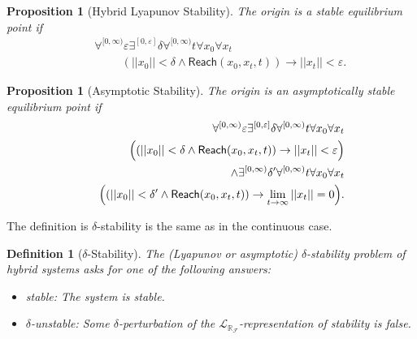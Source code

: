 \documentclass[10pt]{article}
\theoremstyle{plain}
\newtheorem{proposition}[theorem]{Proposition}
\newtheorem{definition}[theorem]{Definition}
\theoremstyle{definition}
\newcommand{\reach}{\mathsf{Reach}}
\newcommand{\lrf}{\mathcal{L}_{\mathbb{R}_{\mathcal{F}}}}
\begin{document}
\begin{proposition}[Hybrid Lyapunov Stability]
The origin is a stable equilibrium point if 
\begin{eqnarray*}
& &\forall^{[0,\infty)} \varepsilon\exists^{[0,\varepsilon]} \delta \forall^{[0,\infty)} t\forall x_0\forall x_t\\
& &\hspace{1cm}(||x_0||<\delta \wedge \reach(x_0,x_t,t) )\rightarrow ||x_t||<\varepsilon.
\end{eqnarray*}
\end{proposition}
\begin{proposition}[Asymptotic Stability]
The origin is an asymptotically stable equilibrium point if 
\begin{eqnarray*}
& &\forall^{[0,\infty)} \varepsilon\exists^{[0,\varepsilon]} \delta\forall^{[0,\infty)} t\forall x_0\forall x_t\\
& &\hspace{.5cm}\Big((||x_0||<\delta \wedge \reach(x_0,x_t,t) )\rightarrow ||x_t||<\varepsilon\Big)\\
& &\wedge \exists^{[0,\infty)} \delta'  \forall^{[0,\infty)} t\forall x_0\forall x_t\\
& & \hspace{.3cm}\Big( (||x_0||<\delta'\wedge \reach(x_0,x_t,t))\rightarrow \lim_{t\rightarrow \infty} ||x_t|| = 0\Big). 
\end{eqnarray*}
\end{proposition}
The definition is $\delta$-stability is the same as in the continuous case. 
\begin{definition}[$\delta$-Stability]\label{sl}
The (Lyapunov or asymptotic) $\delta$-stability problem of hybrid systems asks for one of the following answers:
\begin{itemize}
\item {\sf stable}: The system is stable. 
\item {\sf $\delta$-unstable}: Some $\delta$-perturbation of the $\lrf$-representation of stability is false. 
\end{itemize}
\end{definition}
\end{document}

